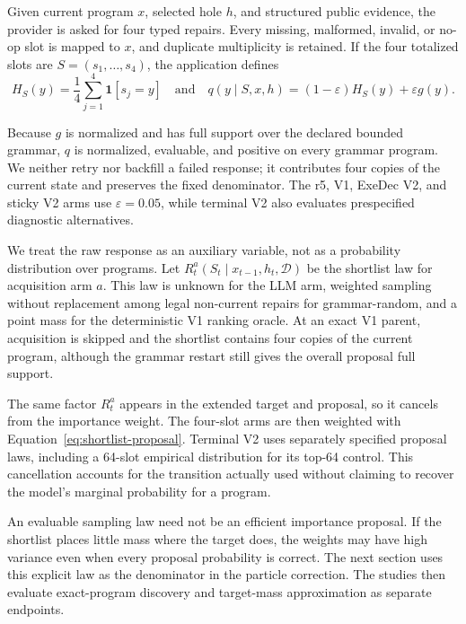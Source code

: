 \documentclass[twoside,11pt]{article}
\newcommand{\data}{\mathcal{D}}
\begin{document}
Given current program $x$, selected hole $h$, and structured public evidence,
the provider is asked for four typed repairs. Every missing, malformed, invalid,
or no-op slot is mapped to $x$, and duplicate multiplicity is retained. If the
four totalized slots are $S=(s_1,\ldots,s_4)$, the application defines
\begin{equation}
H_S(y)=\frac{1}{4}\sum_{j=1}^4\mathbf{1}[s_j=y]
\quad\text{and}\quad
q(y\mid S,x,h)=(1-\varepsilon)H_S(y)+\varepsilon g(y).
\label{eq:shortlist-proposal}
\end{equation}

Because $g$ is normalized and has full support over the declared bounded
grammar, $q$ is normalized, evaluable, and positive on every grammar program.
We neither retry nor backfill a failed response; it contributes four copies of
the current state and preserves the fixed denominator. The r5, V1, ExeDec V2,
and sticky V2 arms use
$\varepsilon=0.05$, while terminal V2 also evaluates prespecified diagnostic
alternatives.

We treat the raw response as an auxiliary variable, not as a probability
distribution over programs. Let $R_t^a(S_t\mid x_{t-1},h_t,\data)$ be the
shortlist law for acquisition arm $a$. This law is unknown for the LLM arm,
weighted sampling without replacement among legal non-current repairs for
grammar-random, and a point mass for the deterministic V1 ranking oracle. At an
exact V1 parent, acquisition is skipped and the shortlist contains four copies
of the current program, although the grammar restart still gives the overall
proposal full support.

The same factor $R_t^a$ appears in the extended target and proposal, so it
cancels from the importance weight. The four-slot arms are then weighted with
Equation~\ref{eq:shortlist-proposal}. Terminal V2 uses separately specified
proposal laws, including a 64-slot empirical distribution for its top-64
control. This cancellation accounts for the transition actually used without
claiming to recover the model's marginal probability for a program.

An evaluable sampling law need not be an efficient importance proposal. If the
shortlist places little mass where the target does, the weights may have high
variance even when every proposal probability is correct. The next section uses
this explicit law as the denominator in the particle correction. The studies
then evaluate exact-program discovery and target-mass approximation as separate
endpoints.
\end{document}
